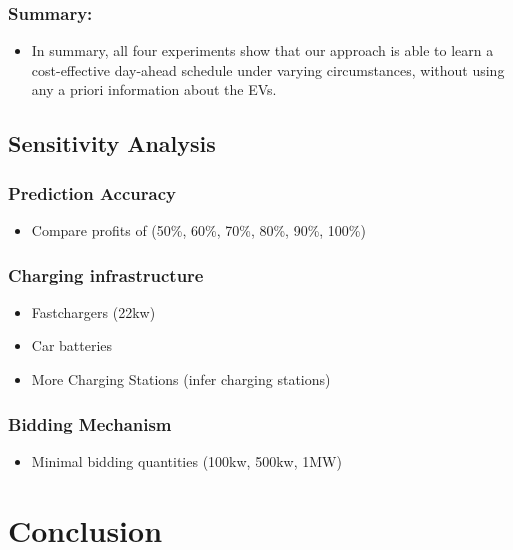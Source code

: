 \documentclass[a4paper, 12pt]{article}
\begin{document}
\subsubsection{Summary:}
\label{sec:org54c40fa}
\begin{itemize}
\item In summary, all four experiments show that our approach is
able to learn a cost-effective day-ahead schedule under varying
circumstances, without using any a priori information about
the EVs.
\end{itemize}

\subsection{Sensitivity Analysis}
\label{sec:orgd83190b}
\subsubsection{Prediction Accuracy}
\label{sec:orgc12aab1}
\begin{itemize}
\item Compare profits of (50\%, 60\%, 70\%, 80\%, 90\%, 100\%)
\end{itemize}

\subsubsection{Charging infrastructure}
\label{sec:org4c17338}
\begin{itemize}
\item Fastchargers (22kw)
\item Car batteries
\item More Charging Stations (infer charging stations)
\end{itemize}

\subsubsection{Bidding Mechanism}
\label{sec:orgba4cadb}
\begin{itemize}
\item Minimal bidding quantities (100kw, 500kw, 1MW)
\end{itemize}

\section{Conclusion}
\label{sec:org0851117}
\end{document}
